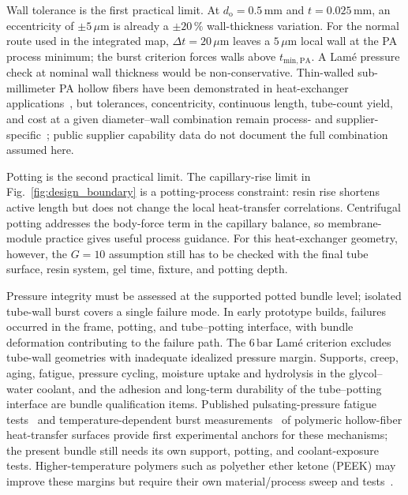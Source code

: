 Wall tolerance is the first practical limit. At
$d_{\mathrm{o}}=0.5\,\mathrm{mm}$ and $t=0.025\,\mathrm{mm}$, an eccentricity of
$\pm 5\,\mu\mathrm{m}$ is already a $\pm 20\,\%$ wall-thickness variation.
For the normal route used in the integrated map,
$\Delta t=20\,\mu\mathrm{m}$ leaves a
$5\,\mu\mathrm{m}$ local wall at the PA process minimum; the burst
criterion forces walls above $t_{\mathrm{min},\mathrm{PA}}$. A Lam\'e pressure
check at nominal wall thickness would be non-conservative. Thin-walled
sub-millimeter PA hollow fibers have been demonstrated in heat-exchanger
applications~\cite{Kroulikova2021,Bulejko2022}, but tolerances, concentricity,
continuous length, tube-count yield, and cost at a given diameter--wall
combination remain process- and supplier-specific~\cite{Mount2017}; public
supplier capability data do not document the full combination assumed here.

Potting is the second practical limit. The capillary-rise limit in
Fig.~\ref{fig:design_boundary} is a potting-process constraint: resin rise
shortens active length but does not change the local heat-transfer
correlations. Centrifugal potting addresses the body-force term in the
capillary balance, so membrane-module practice gives useful process guidance.
For this heat-exchanger geometry, however, the $G=10$ assumption still has to be
checked with the final tube surface, resin system, gel time, fixture, and
potting depth.

Pressure integrity must be assessed at the supported potted bundle level;
isolated tube-wall burst covers a single failure mode. In early prototype
builds, failures occurred in the frame, potting, and tube--potting interface,
with bundle deformation contributing to the failure path. The $6\,\mathrm{bar}$ Lam\'e
criterion excludes tube-wall geometries with inadequate idealized pressure
margin. Supports, creep, aging, fatigue, pressure cycling, moisture uptake and
hydrolysis in the glycol--water coolant, and the adhesion and long-term
durability of the tube--potting interface are bundle qualification items.
Published pulsating-pressure fatigue
tests~\cite{Brozova2016} and temperature-dependent burst
measurements~\cite{Bulejko2022} of polymeric hollow-fiber heat-transfer
surfaces provide first experimental anchors for these mechanisms; the present
bundle still needs its own support, potting, and coolant-exposure tests.
Higher-temperature
polymers such as polyether ether
ketone (PEEK) may improve these margins but require their own material/process
sweep and tests~\cite{Peters2017}.

